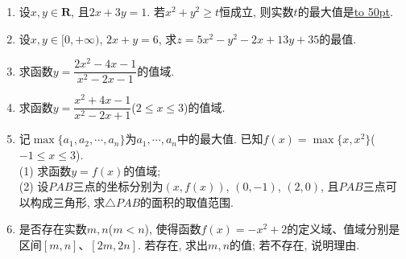 \documentclass[10pt,a4paper]{article}
\newcommand{\blank}[1]{\underline{\hbox to #1pt{}}}
\begin{document}
\begin{enumerate}[1.]
\item 设$x,y\in \mathbf{R}$, 且$2x+3y=1$. 若$x^2+y^2\ge t$恒成立, 则实数$t$的最大值是\blank{50}.
\item 设$x,y\in [0,+\infty)$, $2x+y=6$, 求$z=5x^2-y^2-2x+13y+35$的最值.
\item 求函数$y=\dfrac{2x^2-4x-1}{x^2-2x-1}$的值域.
\item 求函数$y=\dfrac{x^2+4x-1}{x^2-2x+1}$($2\le x\le 3$)的值域.
\item 记$\max\{a_1,a_2,\cdots,a_n\}$为$a_1,\cdots,a_n$中的最大值. 已知$f(x)=\max\{x,x^2\}$($-1\le x\le 3$).\\
(1) 求函数$y=f(x)$的值域;\\
(2) 设$PAB$三点的坐标分别为$(x,f(x))$, $(0,-1)$, $(2,0)$, 且$PAB$三点可以构成三角形, 求$\triangle PAB$的面积的取值范围.
\item 是否存在实数$m,n$($m<n$), 使得函数$f(x)=-x^2+2$的定义域、值域分别是区间$[m,n]$、$[2m,2n]$. 若存在, 求出$m,n$的值; 若不存在, 说明理由.


\end{enumerate}
\end{document}
